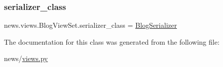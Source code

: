 \mbox{\label{classnews_1_1views_1_1_blog_view_set_aa2cb1ca862d1df2069cea4bb061cf1ba}} 
\subsubsection{\texorpdfstring{serializer\+\_\+class}{serializer\_class}}
{\footnotesize\ttfamily news.\+views.\+Blog\+View\+Set.\+serializer\+\_\+class = \mbox{\hyperlink{classnews_1_1serializers_1_1_blog_serializer}{Blog\+Serializer}}\hspace{0.3cm}{\ttfamily [static]}}



The documentation for this class was generated from the following file\+:\begin{DoxyCompactItemize}
\item 
news/\mbox{\hyperlink{views_8py}{views.\+py}}\end{DoxyCompactItemize}

